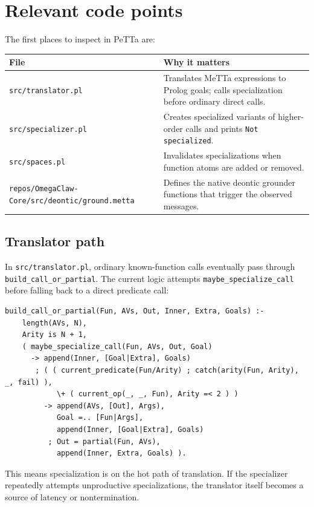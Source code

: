 \documentclass[11pt]{article}
\begin{document}
\section{Relevant code points}

The first places to inspect in PeTTa are:

\begin{longtable}{ll}
\toprule
File & Why it matters \\
\midrule
\texttt{src/translator.pl} & Translates MeTTa expressions to Prolog goals; calls specialization before ordinary direct calls. \\
\texttt{src/specializer.pl} & Creates specialized variants of higher-order calls and prints \texttt{Not specialized}. \\
\texttt{src/spaces.pl} & Invalidates specializations when function atoms are added or removed. \\
\texttt{repos/OmegaClaw-Core/src/deontic/ground.metta} & Defines the native deontic grounder functions that trigger the observed messages. \\
\bottomrule
\end{longtable}

\subsection{Translator path}

In \texttt{src/translator.pl}, ordinary known-function calls eventually pass through \texttt{build_call_or_partial}. The current logic attempts \texttt{maybe_specialize_call} before falling back to a direct predicate call:

\begin{lstlisting}
build_call_or_partial(Fun, AVs, Out, Inner, Extra, Goals) :-
    length(AVs, N),
    Arity is N + 1,
    ( maybe_specialize_call(Fun, AVs, Out, Goal)
      -> append(Inner, [Goal|Extra], Goals)
       ; ( ( current_predicate(Fun/Arity) ; catch(arity(Fun, Arity), _, fail) ),
            \+ ( current_op(_, _, Fun), Arity =< 2 ) )
         -> append(AVs, [Out], Args),
            Goal =.. [Fun|Args],
            append(Inner, [Goal|Extra], Goals)
          ; Out = partial(Fun, AVs),
            append(Inner, Extra, Goals) ).
\end{lstlisting}

This means specialization is on the hot path of translation. If the specializer repeatedly attempts unproductive specializations, the translator itself becomes a source of latency or nontermination.
\end{document}
